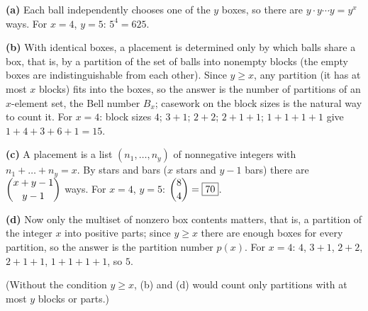 \textbf{(a)} Each ball independently chooses one of the $y$ boxes, so there are $y\cdot y\cdots y=y^x$ ways. For $x=4$, $y=5$: $5^4=\boxed{625}$.

\textbf{(b)} With identical boxes, a placement is determined only by which balls share a box, that is, by a partition of the set of balls into nonempty blocks (the empty boxes are indistinguishable from each other). Since $y\ge x$, any partition (it has at most $x$ blocks) fits into the boxes, so the answer is the number of partitions of an $x$-element set, the Bell number $B_x$; casework on the block sizes is the natural way to count it. For $x=4$: block sizes $4$; $3+1$; $2+2$; $2+1+1$; $1+1+1+1$ give $1+4+3+6+1=\boxed{15}$.

\textbf{(c)} A placement is a list $(n_1,\dots,n_y)$ of nonnegative integers with $n_1+\dots+n_y=x$. By stars and bars ($x$ stars and $y-1$ bars) there are $\dbinom{x+y-1}{y-1}$ ways. For $x=4$, $y=5$: $\dbinom84=\boxed{70}$.

\textbf{(d)} Now only the multiset of nonzero box contents matters, that is, a partition of the integer $x$ into positive parts; since $y\ge x$ there are enough boxes for every partition, so the answer is the partition number $p(x)$. For $x=4$: $4$, $3+1$, $2+2$, $2+1+1$, $1+1+1+1$, so $\boxed{5}$.

(Without the condition $y\ge x$, (b) and (d) would count only partitions with at most $y$ blocks or parts.)
